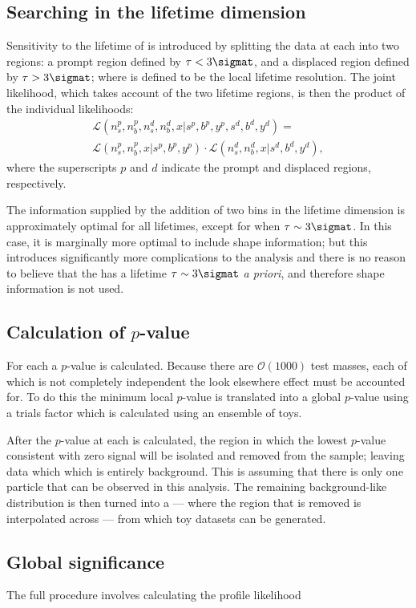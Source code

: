 \subsection{Searching in the lifetime dimension}
Sensitivity to the lifetime of \db is introduced by splitting the data at each  into two
regions: a prompt region defined by $\tau<3\sigmat$, and a displaced region defined by
$\tau>3\sigmat$; where \sigmat is defined to be the local lifetime resolution.
The joint likelihood, which takes account of the two lifetime regions, is then the product of the
individual likelihoods:
\begin{multline}
  \mathcal{L}(n^p_s, n^p_b, n^d_s, n^d_b, x | s^p, b^p, y^p, s^d, b^d, y^d) =\\
  \mathcal{L}(n^p_s, n^p_b, x | s^p, b^p, y^p) \cdot
  \mathcal{L}(n^d_s, n^d_b, x | s^d, b^d, y^d),
\end{multline}
where the superscripts $p$ and $d$ indicate the prompt and displaced regions, respectively.

The information supplied by the addition of two bins in the lifetime dimension is approximately
optimal for all \db lifetimes, except for when $\tau\sim3\sigmat$.
In this case, it is marginally more optimal to include shape information; but this introduces
significantly more complications to the analysis and there is no reason to believe that the \db has
a lifetime $\tau\sim3\sigmat$ \emph{a priori}, and therefore shape information is not used.


\subsection{Calculation of $p$-value}
For each  a $p$-value is calculated.
Because there are $\mathcal{O}(1000)$ test masses, each of which is not completely independent the
look elsewhere effect must be accounted for.
To do this the minimum local $p$-value is translated into a global $p$-value using a trials factor
which is calculated using an ensemble of toys.

After the $p$-value at each  is calculated, the region in which the lowest $p$-value
consistent with zero signal will be isolated and removed from the sample; leaving data which
which is entirely background.
This is assuming that there is only one \np particle that can be observed in this analysis.
The remaining background-like distribution is then turned into a \PDF --- where the region that is
removed is interpolated across --- from which toy datasets can be generated.








\subsection{Global significance}
The full procedure involves calculating the profile likelihood




























